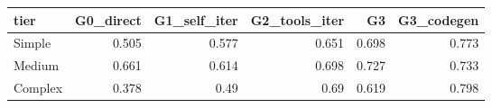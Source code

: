 \begin{tabular}{lrrrrr}
\toprule
tier & G0\_direct & G1\_self\_iter & G2\_tools\_iter & G3 & G3\_codegen \\
\midrule
Simple & 0.505 & 0.577 & 0.651 & 0.698 & 0.773 \\
Medium & 0.661 & 0.614 & 0.698 & 0.727 & 0.733 \\
Complex & 0.378 & 0.49 & 0.69 & 0.619 & 0.798 \\
\bottomrule
\end{tabular}
